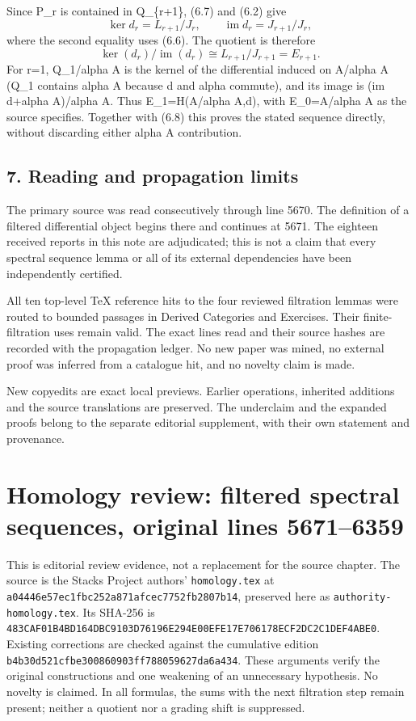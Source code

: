 \documentclass[11pt]{article}
\begin{document}
Since P\_r is contained in Q\_\{r+1\}, (6.7) and (6.2) give \[
\ker d_r=L_{r+1}/J_r,\qquad
\operatorname{im}d_r=J_{r+1}/J_r,
\] where the second equality uses (6.6). The quotient is therefore \[
\ker(d_r)/\operatorname{im}(d_r)
\cong L_{r+1}/J_{r+1}=E_{r+1}.                            \tag{6.8}
\] For r=1, Q\_1/alpha A is the kernel of the differential induced on A/alpha A (Q\_1 contains alpha A because d and alpha commute), and its image is (im d+alpha A)/alpha A. Thus E\_1=H(A/alpha A,d), with E\_0=A/alpha A as the source specifies. Together with (6.8) this proves the stated sequence directly, without discarding either alpha A contribution.

\subsection{7. Reading and propagation limits}\label{note-05-reading-and-propagation-limits}

The primary source was read consecutively through line 5670. The definition of a filtered differential object begins there and continues at 5671. The eighteen received reports in this note are adjudicated; this is not a claim that every spectral sequence lemma or all of its external dependencies have been independently certified.

All ten top-level TeX reference hits to the four reviewed filtration lemmas were routed to bounded passages in Derived Categories and Exercises. Their finite-filtration uses remain valid. The exact lines read and their source hashes are recorded with the propagation ledger. No new paper was mined, no external proof was inferred from a catalogue hit, and no novelty claim is made.

New copyedits are exact local previews. Earlier operations, inherited additions and the source translations are preserved. The underclaim and the expanded proofs belong to the separate editorial supplement, with their own statement and provenance.
\clearpage
\section{Homology review: filtered spectral sequences, original lines 5671--6359}\label{note-06-homology-review-filtered-spectral-sequences-original-lines-56716359}

This is editorial review evidence, not a replacement for the source chapter. The source is the Stacks Project authors' \texttt{homology.tex} at \texttt{a04446e5\allowbreak{}7ec1fbc2\allowbreak{}52a871af\allowbreak{}cec7752f\allowbreak{}b2807b14}, preserved here as \texttt{authority-homology.tex}. Its SHA-256 is \texttt{483CAF01\allowbreak{}B4BD164D\allowbreak{}BC9103D7\allowbreak{}6196E294\allowbreak{}E00EFE17\allowbreak{}E706178E\allowbreak{}CF2DC2C1\allowbreak{}DEF4ABE0}. Existing corrections are checked against the cumulative edition \texttt{b4b30d52\allowbreak{}1cfbe300\allowbreak{}860903ff\allowbreak{}78805962\allowbreak{}7da6a434}. These arguments verify the original constructions and one weakening of an unnecessary hypothesis. No novelty is claimed. In all formulas, the sums with the next filtration step remain present; neither a quotient nor a grading shift is suppressed.
\end{document}
